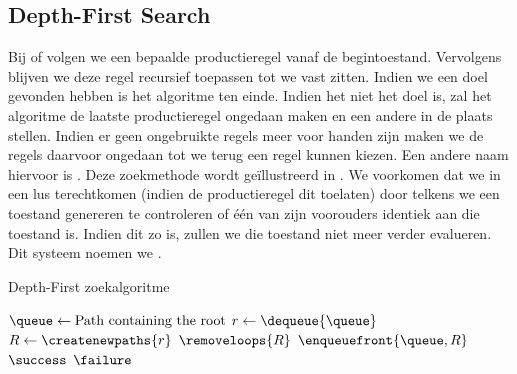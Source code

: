 \subsection{Depth-First Search}
Bij  of  volgen we een bepaalde productieregel vanaf de begintoestand. Vervolgens blijven we deze regel recursief toepassen tot we vast zitten. Indien we een doel gevonden hebben is het algoritme ten einde. Indien het niet het doel is, zal het algoritme de laatste productieregel ongedaan maken en een andere in de plaats stellen. Indien er geen ongebruikte regels meer voor handen zijn maken we de regels daarvoor ongedaan tot we terug een regel kunnen kiezen. Een andere naam hiervoor is . Deze zoekmethode wordt ge\"illustreerd in . We voorkomen dat we in een lus terechtkomen (indien de productieregel dit toelaten) door telkens we een toestand genereren te controleren of \'e\'en van zijn voorouders identiek aan die toestand is. Indien dit zo is, zullen we die toestand niet meer verder evalueren. Dit systeem noemen we .
\begin{algorithm}[htb]                      %
\caption{Depth-First zoekalgoritme}          %
\label{alg:depthFirst}                           %
\begin{algorithmic}[1]                    %
\STATE $\queue\leftarrow\mbox{Path containing the root}$
\WHILE{$\notempty{\queue}\wedge\neg\goalreached{\queue}$}
\STATE $r\leftarrow\dequeue{\queue}$
\STATE $R\leftarrow\createnewpaths{r}$
\STATE $\removeloops{R}$
\STATE $\enqueuefront{\queue,R}$
\ENDWHILE
\IF{$\goalreached{\queue}$}
\RETURN $\success$
\ELSE
\RETURN $\failure$
\ENDIF
\end{algorithmic}
\end{algorithm}
